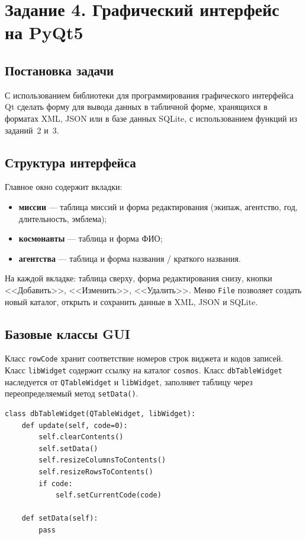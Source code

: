 \documentclass[a4paper,14pt]{extarticle}
\begin{document}
\section{Задание 4. Графический интерфейс на PyQt5}

\subsection{Постановка задачи}

С использованием библиотеки для программирования графического интерфейса Qt сделать форму для вывода данных в табличной форме, хранящихся в форматах XML, JSON или в базе данных SQLite, с использованием функций из заданий~2 и~3.

\subsection{Структура интерфейса}

Главное окно содержит вкладки:
\begin{itemize}[leftmargin=*]
\item \textbf{миссии} --- таблица миссий и форма редактирования (экипаж, агентство, год, длительность, эмблема);
\item \textbf{космонавты} --- таблица и форма ФИО;
\item \textbf{агентства} --- таблица и форма названия / краткого названия.
\end{itemize}

На каждой вкладке: таблица сверху, форма редактирования снизу, кнопки <<Добавить>>, <<Изменить>>, <<Удалить>>. Меню \texttt{File} позволяет создать новый каталог, открыть и сохранить данные в XML, JSON и SQLite.

\subsection{Базовые классы GUI}

Класс \texttt{rowCode} хранит соответствие номеров строк виджета и кодов записей. Класс \texttt{libWidget} содержит ссылку на каталог \texttt{cosmos}. Класс \texttt{dbTableWidget} наследуется от \texttt{QTableWidget} и \texttt{libWidget}, заполняет таблицу через переопределяемый метод \texttt{setData()}.

\begin{lstlisting}[caption={Фрагмент \texttt{dbTableWidget}}]
class dbTableWidget(QTableWidget, libWidget):
    def update(self, code=0):
        self.clearContents()
        self.setData()
        self.resizeColumnsToContents()
        self.resizeRowsToContents()
        if code:
            self.setCurrentCode(code)

    def setData(self):
        pass
\end{lstlisting}
\end{document}
